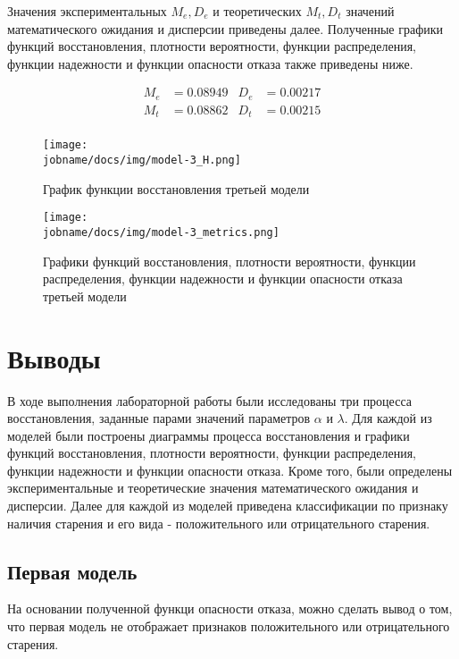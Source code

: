 Значения экспериментальных  $M_e, D_e$ и теоретических $M_t, D_t$ значений математического ожидания и дисперсии
приведены далее.
Полученные графики функций восстановления, плотности вероятности, функции распределения, функции надежности и функции
опасности отказа также приведены ниже.

\begin{align*}
     M_e & = 0.08949 & D_e & = 0.00217 \\
     M_t & = 0.08862 & D_t & = 0.00215 \\
\end{align*}

\begin{figure}[h!]
    \centering
    \texttt{[image: \\jobname/docs/img/model-3\_H.png]}
    \caption{График функции восстановления третьей модели}
\end{figure}

\begin{figure}[h!]
    \centering
    \texttt{[image: \\jobname/docs/img/model-3\_metrics.png]}
    \caption{Графики функций восстановления, плотности вероятности, функции распределения, функции надежности и функции
    опасности отказа третьей модели}
\end{figure}

\clearpage

\section*{Выводы}

В ходе выполнения лабораторной работы были исследованы три процесса восстановления, заданные парами значений
параметров $\alpha$ и $\lambda$.
Для каждой из моделей были построены диаграммы процесса восстановления и графики функций восстановления,
плотности вероятности, функции распределения, функции надежности и функции опасности отказа.
Кроме того, были определены экспериментальные и теоретические значения математического ожидания и дисперсии.
Далее для каждой из моделей приведена классификации по признаку наличия старения и его вида - положительного или
отрицательного старения.

\subsection*{Первая модель}

На основании полученной функци опасности отказа, можно сделать вывод о том, что первая модель не отображает признаков
положительного или отрицательного старения.

